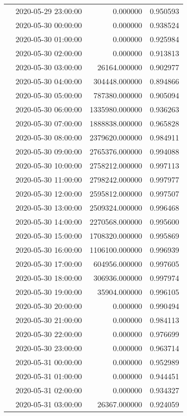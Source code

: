 \begin{tabular}{llrr}
 & 2020-05-29 23:00:00 & 0.000000 & 0.950593 \\
 & 2020-05-30 00:00:00 & 0.000000 & 0.938524 \\
 & 2020-05-30 01:00:00 & 0.000000 & 0.925984 \\
 & 2020-05-30 02:00:00 & 0.000000 & 0.913813 \\
 & 2020-05-30 03:00:00 & 26164.000000 & 0.902977 \\
 & 2020-05-30 04:00:00 & 304448.000000 & 0.894866 \\
 & 2020-05-30 05:00:00 & 787380.000000 & 0.905094 \\
 & 2020-05-30 06:00:00 & 1335980.000000 & 0.936263 \\
 & 2020-05-30 07:00:00 & 1888838.000000 & 0.965828 \\
 & 2020-05-30 08:00:00 & 2379620.000000 & 0.984911 \\
 & 2020-05-30 09:00:00 & 2765376.000000 & 0.994088 \\
 & 2020-05-30 10:00:00 & 2758212.000000 & 0.997113 \\
 & 2020-05-30 11:00:00 & 2798242.000000 & 0.997977 \\
 & 2020-05-30 12:00:00 & 2595812.000000 & 0.997507 \\
 & 2020-05-30 13:00:00 & 2509324.000000 & 0.996468 \\
 & 2020-05-30 14:00:00 & 2270568.000000 & 0.995600 \\
 & 2020-05-30 15:00:00 & 1708320.000000 & 0.995869 \\
 & 2020-05-30 16:00:00 & 1106100.000000 & 0.996939 \\
 & 2020-05-30 17:00:00 & 604956.000000 & 0.997605 \\
 & 2020-05-30 18:00:00 & 306936.000000 & 0.997974 \\
 & 2020-05-30 19:00:00 & 35904.000000 & 0.996105 \\
 & 2020-05-30 20:00:00 & 0.000000 & 0.990494 \\
 & 2020-05-30 21:00:00 & 0.000000 & 0.984113 \\
 & 2020-05-30 22:00:00 & 0.000000 & 0.976699 \\
 & 2020-05-30 23:00:00 & 0.000000 & 0.963714 \\
 & 2020-05-31 00:00:00 & 0.000000 & 0.952989 \\
 & 2020-05-31 01:00:00 & 0.000000 & 0.944451 \\
 & 2020-05-31 02:00:00 & 0.000000 & 0.934327 \\
 & 2020-05-31 03:00:00 & 26367.000000 & 0.924059 \\

\end{tabular}
